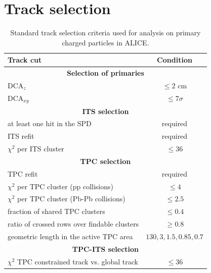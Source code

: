 \documentclass[12pt,a4paper]{report}
\begin{document}
\section{Track selection}
\label{TrackSelection}
\begin{table}[tb!]
\renewcommand{\arraystretch}{1.5}
\centering
\begin{tabular}{l c}
\toprule
\rowcolor{headerBlue}  \textbf{Track cut} &  \textbf{Condition} \\
\midrule
\multicolumn{2}{c}{\textbf{Selection of primaries}} \\
\midrule
$\text{DCA}_{z}$ & $\leq 2 $ cm\\
$\text{DCA}_{xy}$ & $\leq 7\sigma$ \\
\midrule
\multicolumn{2}{c}{\textbf{ITS selection}} \\
\midrule
at least one hit in the SPD & required \\
ITS refit &  required\\
$\chi^2$ per ITS cluster  & $\leq 36$ \\
\midrule
\multicolumn{2}{c}{\textbf{TPC selection}} \\
\midrule
TPC refit &  required\\
$\chi^2$ per TPC cluster (pp collisions) & $\leq 4$ \\
$\chi^2$ per TPC cluster (Pb-Pb collisions) & $\leq 2.5$ \\
fraction of shared  TPC clusters&  $\leq 0.4$\\
ratio of crossed rows over findable clusters  & $\geq 0.8$ \\
geometric length in the active TPC area & $130, 3, 1.5, 0.85, 0.7$ \\
\midrule
\multicolumn{2}{c}{\textbf{TPC-ITS selection}} \\
\midrule
$\chi^2$ TPC constrained track vs. global track  & $\leq 36$ \\
\bottomrule
\end{tabular}
\caption{Standard track selection criteria used for analysis on primary charged particles in ALICE.}
\label{tab:Cuts}
\end{table}
\end{document}
